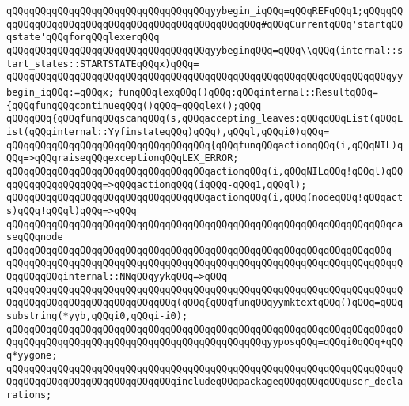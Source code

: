 \verb|qQQqqQQqqQQqqQQqqQQqqQQqqQQqqQQqqQQqyybegin_iqQQq=qQQqREFqQQq1;qQQqqQQqqQQqqQQqqQQqqQQqqQQqqQQqqQQqqQQqqQQqqQQqqQQq#qQQqCurrentqQQq'startqQQqstate'qQQqforqQQqlexerqQQq|\newline
\newline
\verb|qQQqqQQqqQQqqQQqqQQqqQQqqQQqqQQqqQQqyybeginqQQq=qQQq\\qQQq(internal::start_states::STARTSTATEqQQqx)qQQq=|\newline
\verb|qQQqqQQqqQQqqQQqqQQqqQQqqQQqqQQqqQQqqQQqqQQqqQQqqQQqqQQqqQQqqQQqqQQqyybegin_iqQQq:=qQQqx;|\newline
\newline
\verb|funqQQqlexqQQq()qQQq:qQQqinternal::ResultqQQq=|\newline
\verb|{qQQqfunqQQqcontinueqQQq()qQQq=qQQqlex();qQQq|\newline
\verb|qQQqqQQq{qQQqfunqQQqscanqQQq(s,qQQqaccepting_leaves:qQQqqQQqList(qQQqList(qQQqinternal::YyfinstateqQQq)qQQq),qQQql,qQQqi0)qQQq=|\newline
\verb|qQQqqQQqqQQqqQQqqQQqqQQqqQQqqQQqqQQq{qQQqfunqQQqactionqQQq(i,qQQqNIL)qQQq=>qQQqraiseqQQqexceptionqQQqLEX_ERROR;|\newline
\verb|qQQqqQQqqQQqqQQqqQQqqQQqqQQqqQQqqQQqactionqQQq(i,qQQqNILqQQq!qQQql)qQQqqQQqqQQqqQQqqQQq=>qQQqactionqQQq(iqQQq-qQQq1,qQQql);|\newline
\verb|qQQqqQQqqQQqqQQqqQQqqQQqqQQqqQQqqQQqactionqQQq(i,qQQq(nodeqQQq!qQQqacts)qQQq!qQQql)qQQq=>qQQq|\newline
\verb|qQQqqQQqqQQqqQQqqQQqqQQqqQQqqQQqqQQqqQQqqQQqqQQqqQQqqQQqqQQqqQQqqQQqcaseqQQqnode|\newline
\verb|qQQqqQQqqQQqqQQqqQQqqQQqqQQqqQQqqQQqqQQqqQQqqQQqqQQqqQQqqQQqqQQqqQQq|\newline
\verb|qQQqqQQqqQQqqQQqqQQqqQQqqQQqqQQqqQQqqQQqqQQqqQQqqQQqqQQqqQQqqQQqqQQqqQQqqQQqqQQqinternal::NNqQQqyykqQQq=>qQQq|\newline
\verb|qQQqqQQqqQQqqQQqqQQqqQQqqQQqqQQqqQQqqQQqqQQqqQQqqQQqqQQqqQQqqQQqqQQqqQQqqQQqqQQqqQQqqQQqqQQqqQQqqQQq(qQQq{qQQqfunqQQqyymktextqQQq()qQQq=qQQqsubstring(*yyb,qQQqi0,qQQqi-i0);|\newline
\verb|qQQqqQQqqQQqqQQqqQQqqQQqqQQqqQQqqQQqqQQqqQQqqQQqqQQqqQQqqQQqqQQqqQQqqQQqqQQqqQQqqQQqqQQqqQQqqQQqqQQqqQQqqQQqqQQqqQQqyyposqQQq=qQQqi0qQQq+qQQq*yygone;|\newline
\verb|qQQqqQQqqQQqqQQqqQQqqQQqqQQqqQQqqQQqqQQqqQQqqQQqqQQqqQQqqQQqqQQqqQQqqQQqqQQqqQQqqQQqqQQqqQQqqQQqqQQqincludeqQQqpackageqQQqqQQqqQQquser_declarations;|\newline
